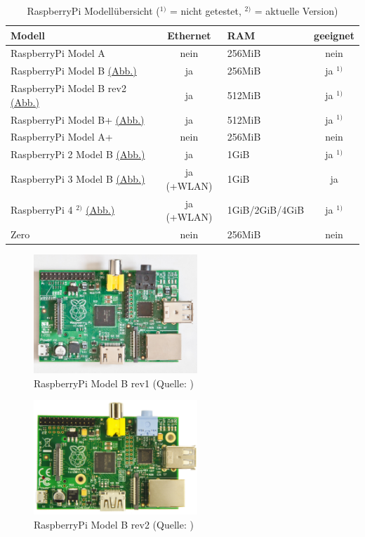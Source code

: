 \begin{table}[h!]
  \center
  \begin{tabular}{ l | c | l || c }
    \hline
    Modell & Ethernet & RAM & geeignet \\ \hline
    RaspberryPi Model A & nein & 256MiB & nein \\
    RaspberryPi Model B {\hyperref[fig:rpib1]{(Abb.)}} & ja & 256MiB & ja $^{1)}$ \\
    RaspberryPi Model B rev2 {\hyperref[fig:rpib2]{(Abb.)}} & ja & 512MiB & ja $^{1)}$ \\
    RaspberryPi Model B+ {\hyperref[fig:rpibplus]{(Abb.)}} & ja & 512MiB & ja $^{1)}$ \\
    RaspberryPi Model A+ & nein & 256MiB & nein \\
    RaspberryPi 2 Model B {\hyperref[fig:rpi2b]{(Abb.)}} & ja & 1GiB & ja $^{1)}$ \\
    RaspberryPi 3 Model B {\hyperref[fig:rpi3b]{(Abb.)}} & ja (+WLAN) & 1GiB & ja \\
    RaspberryPi 4 $^{2)}$ {\hyperref[fig:rpi4b]{(Abb.)}} & ja (+WLAN) & 1GiB/2GiB/4GiB & ja $^{1)}$ \\
    Zero & nein & 256MiB & nein \\
    \hline
  \end{tabular}
	\caption{RaspberryPi Modellübersicht ($^{1)}$ = nicht getestet, $^{2)}$ = aktuelle Version)}
	\label{tab:rpimodels}
\end{table}

\clearpage

\begin{figure}[h!]
	\centering
		\includegraphics[width=0.55\textwidth]{./fotos/Raspberry_Pi_B_rev_1.jpg}
	\caption{RaspberryPi Model B rev1 (Quelle: \cite{rpib1})}
	\label{fig:rpib1}
\end{figure}

\begin{figure}[h!]
	\centering
		\includegraphics[width=0.55\textwidth]{./fotos/Raspberry_Pi_B_rev_2.jpg}
	\caption{RaspberryPi Model B rev2 (Quelle: \cite{rpib2})}
	\label{fig:rpib2}
\end{figure}

